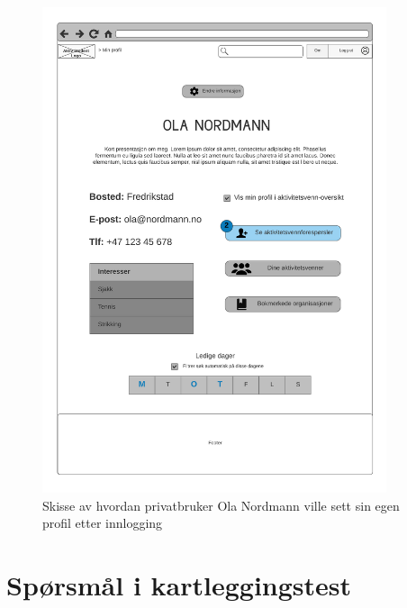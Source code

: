 \begin{figure}[H]
\centering
\includegraphics[width=0.9\textwidth]{Illustrasjoner/Skisser/2.0/2-11-innlogget-brukerprofil.png}
\caption{Skisse av hvordan privatbruker Ola Nordmann ville sett sin egen profil etter innlogging}
\label{vedlegg:2-11-innlogget-bruker}
\end{figure}

\section{Spørsmål i kartleggingstest}

